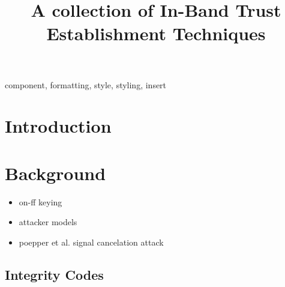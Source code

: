 \documentclass[conference]{IEEEtran}
\begin{document}
\title{A collection of In-Band Trust Establishment Techniques\\
}

\author{
}

\maketitle

\begin{abstract}

\end{abstract}

\begin{IEEEkeywords}
component, formatting, style, styling, insert
\end{IEEEkeywords}

\section{Introduction}

\section{Background}
\begin{itemize}
    \item on-ff keying
    \item attacker models
    \item poepper et al. signal cancelation attack
\end{itemize}

\subsection{Integrity Codes}
\end{document}
